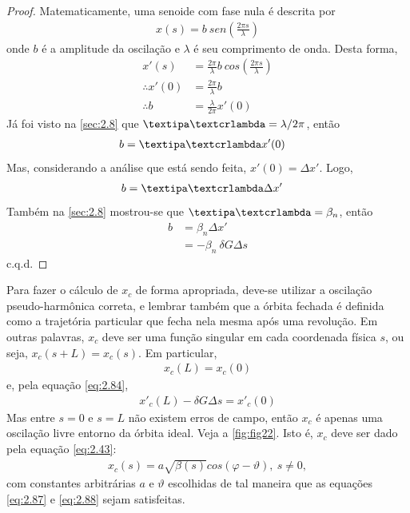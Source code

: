 \begin{proof}
	Matematicamente, uma senoide com fase nula é descrita por
	\begin{align*}
		x(s) = b\ sen\left(\frac{2\pi s}{\lambda}\right)
	\end{align*}
	onde $b$ é a amplitude da oscilação e $\lambda$ é seu comprimento de onda. Desta forma,
	\begin{align*}
		x'(s) &= \frac{2\pi}{\lambda}b\ cos\left(\frac{2\pi s}{\lambda}\right)\\
		\therefore x'(0) & = \frac{2\pi}{\lambda}b\\
		\therefore b &= \frac{\lambda}{2\pi}x'(0)
	\end{align*}
	Já foi visto na \autoref{sec:2.8} que $\lambdabar = \lambda/2\pi$, então
	\begin{align*}
		b &= \lambdabar x'(0)
	\end{align*}
	Mas, considerando a análise que está sendo feita, $x'(0) = \Delta x'$. Logo,
	\begin{align*}
		b &= \lambdabar \Delta x'
	\end{align*}
	Também na \autoref{sec:2.8} mostrou-se que $\lambdabar = \beta_n$, então
	\begin{align*}
		b &= \beta_n \Delta x'\\
		  &= -\beta_n\ \delta G \Delta s
	\end{align*}
	c.q.d.
\end{proof}

Para fazer o cálculo de $x_c$ de forma apropriada, deve-se utilizar a oscilação pseudo-harmônica correta, e lembrar também que a órbita fechada é definida como a trajetória particular que fecha nela mesma após uma revolução. Em outras palavras, $x_c$ deve ser uma função singular em cada coordenada física $s$, ou seja, $x_c(s+L) = x_c(s)$. Em particular,
\begin{align}
	x_c(L) = x_c(0)\label{eq:2.87}
\end{align}
e, pela equação \eqref{eq:2.84},
\begin{align}
	x'_c(L) - \delta G \Delta s = x'_c(0)\label{eq:2.88}
\end{align}
Mas entre $s=0$ e $s=L$ não existem erros de campo, então $x_c$ é apenas uma oscilação livre entorno da órbita ideal. Veja a \autoref{fig:fig22}. Isto é, $x_c$ deve ser dado pela equação \eqref{eq:2.43}:
\begin{align}
	x_c(s) = a\sqrt{\beta(s)}cos(\varphi - \vartheta),\ s \neq 0,\label{eq:2.89}
\end{align}
com constantes arbitrárias $a$ e $\vartheta$ escolhidas de tal maneira que as equações \eqref{eq:2.87} e \eqref{eq:2.88} sejam satisfeitas.

